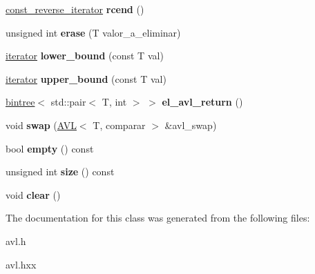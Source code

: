 \begin{DoxyCompactItemize}
\item 
\hypertarget{classAVL_a93c9a5c5a730aa3e780a24934750dfea}{\hyperlink{classAVL_1_1const__reverse__iterator}{const\-\_\-reverse\-\_\-iterator} {\bfseries rcend} ()}\label{classAVL_a93c9a5c5a730aa3e780a24934750dfea}

\item 
\hypertarget{classAVL_ac74d1663d319d10ce9d8cabb4c4beebb}{unsigned int {\bfseries erase} (T valor\-\_\-a\-\_\-eliminar)}\label{classAVL_ac74d1663d319d10ce9d8cabb4c4beebb}

\item 
\hypertarget{classAVL_afcbfe62888d5e1260dfc4bc34947229a}{\hyperlink{classAVL_1_1iterator}{iterator} {\bfseries lower\-\_\-bound} (const T val)}\label{classAVL_afcbfe62888d5e1260dfc4bc34947229a}

\item 
\hypertarget{classAVL_a55cd13c45e6b163e9584745833979f6a}{\hyperlink{classAVL_1_1iterator}{iterator} {\bfseries upper\-\_\-bound} (const T val)}\label{classAVL_a55cd13c45e6b163e9584745833979f6a}

\item 
\hypertarget{classAVL_ae585854fc81b1354053efce8348a40ff}{\hyperlink{classbintree}{bintree}$<$ std\-::pair$<$ T, int $>$ $>$ {\bfseries el\-\_\-avl\-\_\-return} ()}\label{classAVL_ae585854fc81b1354053efce8348a40ff}

\item 
\hypertarget{classAVL_aabb949b0056d331c5d49db7445f250fa}{void {\bfseries swap} (\hyperlink{classAVL}{A\-V\-L}$<$ T, comparar $>$ \&avl\-\_\-swap)}\label{classAVL_aabb949b0056d331c5d49db7445f250fa}

\item 
\hypertarget{classAVL_ac56f115706871102e7092b8e7263089e}{bool {\bfseries empty} () const }\label{classAVL_ac56f115706871102e7092b8e7263089e}

\item 
\hypertarget{classAVL_a5ce8492757147057ba9e023ded0465db}{unsigned int {\bfseries size} () const }\label{classAVL_a5ce8492757147057ba9e023ded0465db}

\item 
\hypertarget{classAVL_ae9f523c58a19d6f5151d30f454b6c1b8}{void {\bfseries clear} ()}\label{classAVL_ae9f523c58a19d6f5151d30f454b6c1b8}

\end{DoxyCompactItemize}


The documentation for this class was generated from the following files\-:\begin{DoxyCompactItemize}
\item 
avl.\-h\item 
avl.\-hxx\end{DoxyCompactItemize}
